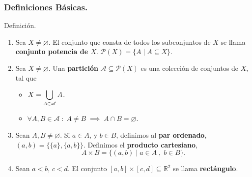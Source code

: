 \documentclass{beamer}
\begin{document}


\begin{frame}[plain]
	
\end{frame}

\begin{frame}[t]
	\frametitle{Definiciones Básicas.}
	\begin{block}{Definición.}
		\begin{enumerate}
			\item Sea \(X \ne \varnothing\). El conjunto que consta de todos los subconjuntos de \(X\) se llama \textbf{conjunto potencia de \(X\)}.
				\(\mathscr{P}(X) = \{A \;|\; A \subseteq X\}.
				\)
			\item Sea \(X \ne \varnothing\). Una \textbf{partición} \(\mathscr{A} \subseteq \mathscr{P}(X)\) es una colección de conjuntos de \(X\), tal que
				\begin{itemize}
					\item \(X = \displaystyle\bigcup_{A \in \mathscr{A}} A\).
					\item \(\forall A,B \in \mathscr{A} \;:\; A \ne B \;\implies\; A \cap B = \varnothing\).
				\end{itemize}
			\item Sean \(A,B \ne \varnothing\). Si \(a \in A\), y \(b \in B\), definimos al \textbf{par ordenado}, \((a,b) = \{\{a\}, \{a,b\}\}\).
				Definimos el \textbf{producto cartesiano},
				\[
					A \times B = \{(a,b) \;|\; a \in A \;,\; b \in B\}.
				\]
			\item Sean \(a < b \), \(c < d \). El conjunto \([a,b] \times [c,d] \subseteq \mathbb{R} ^2\) se llama \textbf{rectángulo}.
		\end{enumerate}
	\end{block}
\end{frame}
\end{document}
